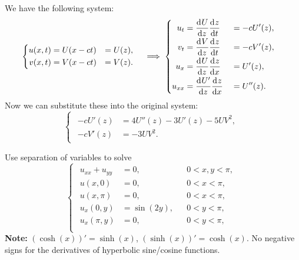 \documentclass[plain]{pset}
\begin{document}
\begin{solution}
    We have the following system:
    \[
        \begin{cases}
            \begin{aligned}
                u(x, t) & = U(x - ct) & = U(z), \\
                v(x, t) & = V(x - ct) & = V(z).
            \end{aligned}
        \end{cases}
        \implies
        \begin{cases}
            \begin{aligned}
                u_t    & = \dv{U}{z}\dv{z}{t}  &  & = -cU'(z), \\
                v_t    & = \dv{V}{z}\dv{z}{t}  &  & = -cV'(z), \\
                u_x    & = \dv{U}{z}\dv{z}{x}  &  & = U'(z),   \\
                u_{xx} & = \dv{U'}{z}\dv{z}{x} &  & = U''(z).
            \end{aligned}
        \end{cases}
    \]
    Now we can substitute these into the original system:
    \[
        \begin{cases}
            \begin{aligned}
                -cU'(z) & = 4U''(z) - 3U'(z) - 5UV^2, \\
                -cV'(z) & = -3UV^2.
            \end{aligned}
        \end{cases}
    \]
\end{solution}

\pagebreak

\begin{problem}
    Use separation of variables to solve
    \[
        \begin{cases}
            \begin{aligned}
                u_{xx} + u_{yy} & = 0, &  & 0 < x, y < \pi, \\
                u(x, 0)         & = 0, &  & 0 < x < \pi,    \\
                u(x, \pi)       & = 0, &  & 0 < x < \pi,    \\
                u_x(0, y)       & = \sin(2y), &  & 0 < y < \pi,    \\
                u_x(\pi, y)     & = 0, &  & 0 < y < \pi,    \\
            \end{aligned}
        \end{cases}
    \]
    \textbf{Note:} \((\cosh(x))' = \sinh(x)\), \((\sinh(x))' = \cosh(x)\). No negative signs for the derivatives of hyperbolic sine/cosine functions.
\end{problem}
\end{document}
